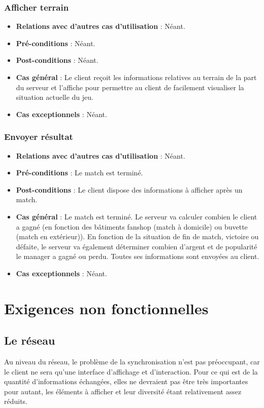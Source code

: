 \documentclass[a4paper,titlepage]{scrreprt}
\begin{document}
    \subsubsection{Afficher terrain}
      \begin{itemize}
        \item \textbf{Relations avec d'autres cas d'utilisation}  : Néant.
        \item \textbf{Pré-conditions} : Néant.
        \item \textbf{Post-conditions} : Néant.
        \item \textbf{Cas général} : Le client reçoit les informations relatives au terrain de la part du serveur et l’affiche pour permettre au client de facilement visualiser la situation actuelle du jeu.
        \item \textbf{Cas exceptionnels} : Néant. 
      \end{itemize}
    \subsubsection{Envoyer résultat}
      \begin{itemize}
        \item \textbf{Relations avec d'autres cas d'utilisation}  : Néant.
        \item \textbf{Pré-conditions} : Le match est terminé.
        \item \textbf{Post-conditions} : Le client dispose des informations à afficher après un match.
        \item \textbf{Cas général} : Le match est terminé. Le serveur va calculer combien le client a gagné (en fonction des bâtiments \gls{fanshop} (match à domicile) ou \gls{buvette} (match en extérieur)). En fonction de la situation de fin de match, victoire ou défaite, le serveur va également déterminer combien d’argent et de popularité le manager a gagné ou perdu. Toutes ses informations sont envoyées au client.
        \item \textbf{Cas exceptionnels} : Néant.
      \end{itemize}




\section{Exigences non fonctionnelles}
  \subsection{Le réseau}
  Au niveau du réseau, le problème de la synchronisation n'est pas préoccupant, 
  car le client ne sera qu'une interface d'affichage et d'interaction. 
  Pour ce qui est de la quantité d'informations échangées, 
  elles ne devraient pas être très importantes pour autant, 
  les éléments à afficher et leur diversité étant relativement assez réduits.
  
\end{document}
